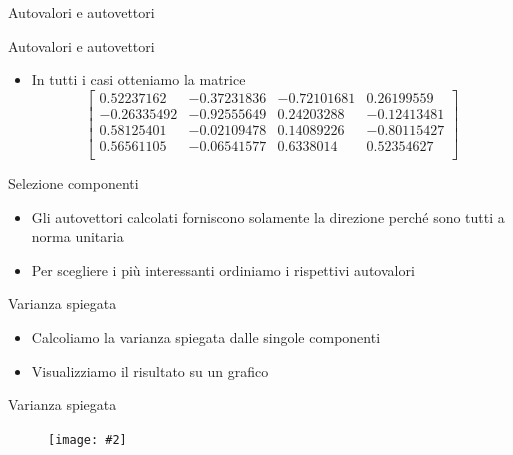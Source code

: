 \documentclass[xcolor={dvipsnames}]{beamer}%
\newcommand{\codice}[2]{}
\newcommand{\figcen}[2]{
	\begin{figure}
		\begin{center}
			\texttt{[image: \#2]}
		\end{center}
	\end{figure}
}
\begin{document}
		\begin{frame}{Autovalori e autovettori}
			\codice{61}{82}
		\end{frame}
	
		\begin{frame}{Autovalori e autovettori}
			\codice{84}{94}
			\begin{itemize}
				\item In tutti i casi otteniamo la matrice $$\begin{bmatrix}
				0.52237162 & -0.37231836 & -0.72101681 & 0.26199559\\
				-0.26335492 & -0.92555649 & 0.24203288 & -0.12413481\\
				0.58125401 & -0.02109478 & 0.14089226 & -0.80115427\\
				0.56561105 & -0.06541577 & 0.6338014 & 0.52354627\\
				\end{bmatrix}$$
			\end{itemize}
		\end{frame}
	
		\begin{frame}{Selezione componenti}
			\begin{itemize}
				\item Gli autovettori calcolati forniscono solamente la direzione perché sono tutti a norma unitaria
				\item Per scegliere i più interessanti ordiniamo i rispettivi autovalori
			\end{itemize}
			\codice{96}{102}
		\end{frame}
	
		\begin{frame}{Varianza spiegata}
			\begin{itemize}
				\item Calcoliamo la varianza spiegata dalle singole componenti
				\item Visualizziamo il risultato su un grafico
			\end{itemize}
			\codice{108}{123}
		\end{frame}
	
		\begin{frame}{Varianza spiegata}
			\figcen{.9\textwidth}{istoVarianza}
		\end{frame}
	
\end{document}
